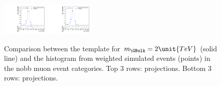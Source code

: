 \begin{figure}[htpb]
  \includegraphics[width=0.2\textwidth]{fig/analysisAppendix/templateVsReco_VBFGbuToWW2000_r0_MJ_mu_HP_vbf_HDy.pdf}
  \includegraphics[width=0.2\textwidth]{fig/analysisAppendix/templateVsReco_VBFGbuToWW2000_r0_MJ_mu_LP_vbf_HDy.pdf}\\
  \caption{
    Comparison between the \VBF\GBulktoWW template for $m_{\GBulk}=2\unit{TeV}$ (solid line) and the histogram from weighted simulated events (points) in the nobb muon event categories.
    Top 3 rows: \MVV projections.
    Bottom 3 rows: \MJ projections.
  }
  \label{fig:1dtemplateVsReco_VBFGbuToWW2000}
\end{figure}

